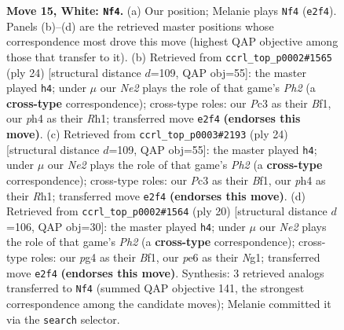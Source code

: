 \documentclass[11pt]{article}
\begin{document}
\begin{figure}[p]
\caption{\textbf{Move 15, White: \texttt{Nf4}.} (a) Our position; Melanie plays \texttt{Nf4} (\texttt{e2f4}). Panels (b)--(d) are the retrieved master positions whose correspondence most drove this move (highest QAP objective among those that transfer to it). (b) Retrieved from \texttt{ccrl\_top\_p0002\#1565} (ply 24) [structural distance $d$=109, QAP obj=55]: the master played \texttt{h4}; under $\mu$ our \emph{Ne2} plays the role of that game's \emph{Ph2} (a \textbf{cross-type} correspondence); cross-type roles: our \emph{P}c3 as their \emph{B}f1, our \emph{p}h4 as their \emph{R}h1; transferred move \texttt{e2f4} \textbf{(endorses this move)}. (c) Retrieved from \texttt{ccrl\_top\_p0003\#2193} (ply 24) [structural distance $d$=109, QAP obj=55]: the master played \texttt{h4}; under $\mu$ our \emph{Ne2} plays the role of that game's \emph{Ph2} (a \textbf{cross-type} correspondence); cross-type roles: our \emph{P}c3 as their \emph{B}f1, our \emph{p}h4 as their \emph{R}h1; transferred move \texttt{e2f4} \textbf{(endorses this move)}. (d) Retrieved from \texttt{ccrl\_top\_p0002\#1564} (ply 20) [structural distance $d$=106, QAP obj=30]: the master played \texttt{h4}; under $\mu$ our \emph{Ne2} plays the role of that game's \emph{Ph2} (a \textbf{cross-type} correspondence); cross-type roles: our \emph{p}g4 as their \emph{B}f1, our \emph{p}e6 as their \emph{N}g1; transferred move \texttt{e2f4} \textbf{(endorses this move)}. Synthesis: 3 retrieved analogs transferred to \texttt{Nf4} (summed QAP objective 141, the strongest correspondence among the candidate moves); Melanie committed it via the \texttt{search} selector.}
\label{fig:thought-m28}
\end{figure}

\clearpage
\end{document}
